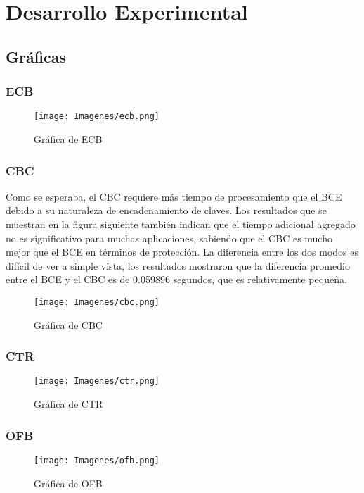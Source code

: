 \documentclass[10pt]{article}
\begin{document}
\section{Desarrollo Experimental}
	\subsection{Gráficas}
		\subsubsection{ECB}
			\begin{figure}[H]
		        \centering
		        \texttt{[image: Imagenes/ecb.png]}
		        \caption{Gráfica de ECB}
	        \end{figure}
     	\subsubsection{CBC}
			Como se esperaba, el CBC requiere más tiempo de procesamiento que el BCE debido a su naturaleza de encadenamiento de claves. Los resultados que se muestran en la figura siguiente también indican que el tiempo adicional agregado no es significativo para muchas aplicaciones, sabiendo que el CBC es mucho mejor que el BCE en términos de protección. La diferencia entre los dos modos es difícil de ver a simple vista, los resultados mostraron que la diferencia promedio entre el BCE y el CBC es de 0.059896 segundos, que es relativamente pequeña.
	
			\begin{figure}[H]
				\centering
				\texttt{[image: Imagenes/cbc.png]}
		        \caption{Gráfica de CBC}
			\end{figure}

		\subsubsection{CTR}
			\begin{figure}[H]
				\centering
				\texttt{[image: Imagenes/ctr.png]}
				\caption{Gráfica de CTR}
			\end{figure}

		\subsubsection{OFB}

			\begin{figure}[H]
				\centering
				\texttt{[image: Imagenes/ofb.png]}
				\caption{Gráfica de OFB}
			\end{figure}
\end{document}

